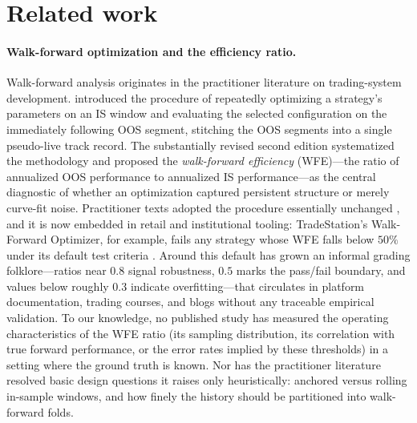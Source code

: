 \documentclass[11pt]{article}
\begin{document}
\section{Related work}
\label{sec:related}

\paragraph{Walk-forward optimization and the efficiency ratio.}
Walk-forward analysis originates in the practitioner literature on
trading-system development. \citet{pardo1992design} introduced the procedure
of repeatedly optimizing a strategy's parameters on an IS window and
evaluating the selected configuration on the immediately following OOS
segment, stitching the OOS segments into a single pseudo-live track record.
The substantially revised second edition \citep{pardo2008evaluation}
systematized the methodology and proposed the \emph{walk-forward efficiency}
(WFE)---the ratio of annualized OOS performance to annualized IS
performance---as the central diagnostic of whether an optimization captured
persistent structure or merely curve-fit noise. Practitioner texts adopted
the procedure essentially unchanged \citep{tomasini2009trading}, and it is now
embedded in retail and institutional tooling: TradeStation's Walk-Forward
Optimizer, for example, fails any strategy whose WFE falls below $50\%$ under
its default test criteria \citep{tradestation_wfo}. Around this default has
grown an informal grading folklore---ratios near $0.8$ signal robustness,
$0.5$ marks the pass/fail boundary, and values below roughly $0.3$ indicate
overfitting---that circulates in platform documentation, trading courses, and
blogs without any traceable empirical validation. To our knowledge, no
published study has measured the operating characteristics of the WFE ratio
(its sampling distribution, its correlation with true forward performance, or
the error rates implied by these thresholds) in a setting where the ground
truth is known. Nor has the practitioner literature resolved basic design
questions it raises only heuristically: anchored versus rolling in-sample
windows, and how finely the history should be partitioned into walk-forward
folds.
\end{document}
